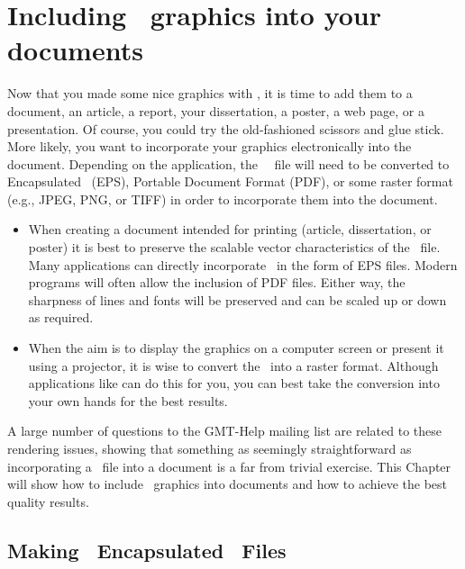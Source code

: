 %
%

\chapter{Including \gmt\ graphics into your documents}
\thispagestyle{headings}
\label{app:C}

Now that you made some nice graphics with \GMT, it is time to add them to a document, an article, a report, your dissertation, a poster, a web page, or a presentation. Of course, you could try the old-fashioned scissors and glue stick. More likely, you want to incorporate your graphics electronically into the document. Depending on the application, the \GMT\ \PS\ file will need to be converted to Encapsulated \PS\ (EPS), Portable Document Format (PDF), or some raster format (e.g., JPEG, PNG, or TIFF) in order to incorporate them into the document.
\begin{itemize}
\item When creating a document intended for printing (article, dissertation, or poster) it is best to preserve the scalable vector characteristics of the \PS\ file. Many applications can directly incorporate \PS\ in the form of EPS files. Modern programs will often allow the inclusion of PDF files. Either way, the sharpness of lines and fonts will be preserved and can be scaled up or down as required.
\item When the aim is to display the graphics on a computer screen or present it using a projector, it is wise to convert the \PS\ into a raster format. Although applications like  can do this for you, you can best take the conversion into your own hands for the best results.
\end{itemize}
A large number of questions to the GMT-Help mailing list are related to these rendering issues, showing that something as seemingly straightforward as incorporating a \PS\ file into a document is a far from trivial exercise.
This Chapter will show how to include \GMT\ graphics into documents and how to achieve the best quality results.

\section{Making \gmt\ Encapsulated \PS\ Files}
\label{sec:eps}

